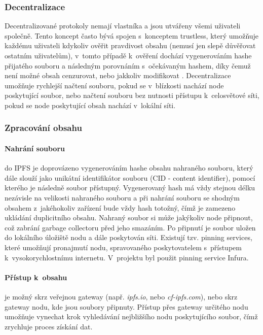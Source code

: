 \documentclass[12pt, a4paper,
  oneside,      %
]{report}
\begin{document}
\subsubsection{Decentralizace}
Decentralizované protokoly nemají vlastníka a jsou utvářeny všemi uživateli společně. Tento koncept často bývá spojen s~konceptem trustless, který umožňuje každému uživateli kdykoliv ověřit pravdivost obsahu (nemusí jen slepě důvěřovat ostatním uživatelům), v~tomto případě k~ověření dochází vygenerováním hashe přijatého souboru a následným porovnáním s~očekávaným hashem, díky čemuž není možné obsah cenzurovat, nebo jakkoliv modifikovat \cite{decentralizedVsTrustless}. Decentralizace umožňuje rychlejší načtení souboru, pokud se v~blízkosti nachází node poskytující soubor, nebo načtení souboru bez nutnosti přístupu k~celosvětové síti, pokud se node poskytující obsah nachází v~lokální síti. \cite{decentralizedAndDistributedNetworks}\cite{decentralizedAndTrustless}
\subsubsection{Zpracování obsahu}
\paragraph{Nahrání souboru} do IPFS je doprovázeno vygenerováním hashe obsahu nahraného souboru, který dále slouží jako unikátní identifikátor souboru (CID - content identifier), pomocí kterého je následně soubor přístupný. Vygenerovaný hash má vždy stejnou délku nezávisle na velikosti nahraného souboru a při nahrání souboru se shodným obsahem z~jakéhokoliv zařízení bude vždy hash totožný, čímž je zamezeno ukládání duplicitního obsahu. Nahraný soubor si může jakýkoliv node připnout, což zabrání garbage collectoru před jeho smazáním. Po připnutí je soubor uložen do lokálního úložiště nodu a dále poskytován síti. Existují tzv. pinning services, které umožňují pronajmutí nodu, spravovaného poskytovatelem s~přístupem k~vysokorychlostnímu internetu. V~projektu byl použit pinning service Infura. \cite{IPFScontentAddressing}\cite{IPFSPersistence}
\paragraph{Přístup k~obsahu} je možný skrz veřejnou gateway (např. \textit{ipfs.io}, nebo \textit{cf-ipfs.com}), nebo skrz gateway nodu, kde jsou soubory připnuty. Přístup přes gateway určitého nodu umožňuje vynechat krok vyhledávání nejbližšího nodu poskytujícího soubor, čímž zrychluje proces získání dat. \cite{IPFSgateways}
\end{document}
